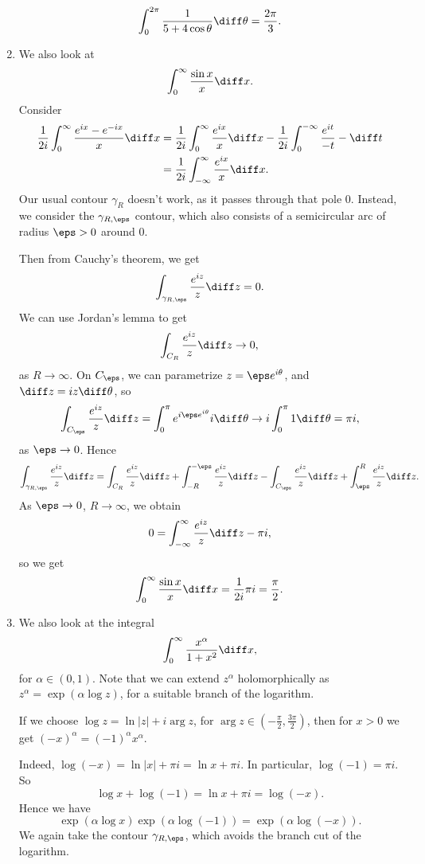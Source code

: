 \documentclass[12pt]{article}
\begin{document}
\begin{exbox}
\begin{enumerate}
		\[
		\int_0^{2\pi}\frac{1}{5 + 4\cos \theta}\diff \theta = \frac{2\pi}{3}.
		\]
	\item We also look at
		\[
		\int_0^{\infty}\frac{\sin x}{x}\diff x.
		\]
		Consider
		\begin{align*}
			\frac{1}{2i}\int_0^{\infty} \frac{e^{ix}-e^{-ix}}{x} \diff x &= \frac{1}{2i} \int_0^{\infty}\frac{e^{ix}}{x}\diff x - \frac{1}{2i} \int_0^{-\infty} \frac{e^{i t}}{-t}-\diff t \\
										     &= \frac{1}{2i} \int_{-\infty}^{\infty} \frac{e^{ix}}{x} \diff x.
		\end{align*}
		Our usual contour $\gamma_R$ doesn't work, as it passes through that pole $0$. Instead, we consider the $\gamma_{R,\eps}$ contour, which also consists of a semicircular arc of radius $\eps > 0$ around $0$.%

		Then from Cauchy's theorem, we get
		\[
		\int_{\gamma_{R,\eps}}\frac{e^{iz}}{z}\diff z = 0.
		\]
		We can use Jordan's lemma to get
		\[
		\int_{C_R}\frac{e^{iz}}{z} \diff z \to 0,
		\]
		as $R \to \infty$. On $C_\eps$, we can parametrize $z = \eps e^{i\theta}$, and $\diff z = i z \diff \theta$, so
		\[
		\int_{C_\eps} \frac{e^{iz}}{z}\diff z = \int_0^{\pi} e^{i \eps e^{i\theta}} i \diff \theta \to i \int_0^{\pi} 1 \diff \theta = \pi i,
		\]
		as $\eps \to 0$. Hence
		\[
		\int_{\gamma_{R,\eps}} \frac{e^{iz}}{z}\diff z = \int_{C_R}\frac{e^{iz}}{z}\diff z + \int_{-R}^{-\eps} \frac{e^{iz}}{z} \diff z - \int_{C_\eps} \frac{e^{iz}}{z} \diff z + \int_{\eps}^{R} \frac{e^{iz}}{z}\diff z.
		\]
		As $\eps \to 0$, $R \to \infty$, we obtain
		\[
		0 = \int_{-\infty}^\infty \frac{e^{iz}}{z}\diff z - \pi i,
		\]
		so we get
		\[
		\int_0^{\infty} \frac{\sin x}{x} \diff x = \frac{1}{2i} \pi i = \frac{\pi}{2}.
		\]
	\item We also look at the integral
		\[
		\int_0^{\infty} \frac{x^{\alpha}}{1 + x^2}\diff x,
		\]
		for $\alpha \in (0, 1)$. Note that we can extend $z^{\alpha}$ holomorphically as $z^{\alpha} = \exp(\alpha \log z)$, for a suitable branch of the logarithm.

		If we choose $\log z = \ln|z| + i \arg z$, for $\arg z \in (- \frac{\pi}{2}, \frac{3 \pi}{2})$, then for $x > 0$ we get $(-x)^{\alpha} = (-1)^{\alpha} x^{\alpha}$.

		Indeed, $\log(-x) = \ln|x| + \pi i = \ln x + \pi i$. In particular, $\log(-1) = \pi i$. So
		\[
		\log x + \log (-1) = \ln x + \pi i = \log(-x).
		\]
		Hence we have
		\[
		\exp(\alpha \log x)\exp(\alpha \log(-1)) = \exp(\alpha \log(-x)).
		\]
		We again take the contour $\gamma_{R,\eps}$, which avoids the branch cut of the logarithm.


\end{enumerate}
\end{exbox}
\end{document}
